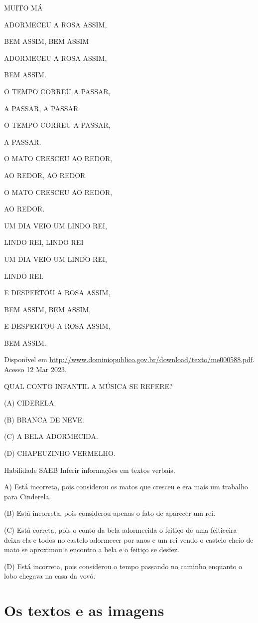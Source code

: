 {{{{{{MUITO MÁ

ADORMECEU A ROSA ASSIM,

BEM ASSIM, BEM ASSIM

ADORMECEU A ROSA ASSIM,

BEM ASSIM.

O TEMPO CORREU A PASSAR,

A PASSAR, A PASSAR

O TEMPO CORREU A PASSAR,

A PASSAR.

O MATO CRESCEU AO REDOR,

AO REDOR, AO REDOR

O MATO CRESCEU AO REDOR,

AO REDOR.

UM DIA VEIO UM LINDO REI,

LINDO REI, LINDO REI

UM DIA VEIO UM LINDO REI,

LINDO REI.

E DESPERTOU A ROSA ASSIM,

BEM ASSIM, BEM ASSIM,

E DESPERTOU A ROSA ASSIM,

BEM ASSIM.

Disponível em
\url{http://www.dominiopublico.gov.br/download/texto/me000588.pdf}.
Acesso 12 Mar 2023.

QUAL CONTO INFANTIL A MÚSICA SE REFERE?

(A) CIDERELA.

(B) BRANCA DE NEVE.

(C) A BELA ADORMECIDA.

(D) CHAPEUZINHO VERMELHO.

Habilidade SAEB Inferir informações em textos verbais.

A) Está incorreta, pois considerou os matos que cresceu e era mais um
trabalho para Cinderela.

(B) Está incorreta, pois considerou apenas o fato de aparecer um rei.

(C) Está correta, pois o conto da bela adormecida o feitiço de uma
feiticeira deixa ela e todos no castelo adormecer por anos e um rei
vendo o castelo cheio de mato se aproximou e encontro a bela e o feitiço
se desfez.

(D) Está incorreta, pois considerou o tempo passando no caminho enquanto
o lobo chegava na casa da
vovó.\protect\hypertarget{_heading=h.ha8xhwafzqp2}{}{\protect\hypertarget{_heading=h.7wgwl7ctcj2x}{}{}}

\chapter{Os textos e as imagens}

}}}}}}
